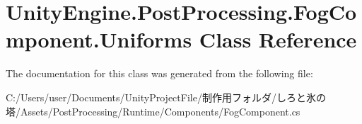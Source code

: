 \hypertarget{class_unity_engine_1_1_post_processing_1_1_fog_component_1_1_uniforms}{}\section{Unity\+Engine.\+Post\+Processing.\+Fog\+Component.\+Uniforms Class Reference}
\label{class_unity_engine_1_1_post_processing_1_1_fog_component_1_1_uniforms}


The documentation for this class was generated from the following file\+:\begin{DoxyCompactItemize}
\item 
C\+:/\+Users/user/\+Documents/\+Unity\+Project\+File/制作用フォルダ/しろと氷の塔/\+Assets/\+Post\+Processing/\+Runtime/\+Components/Fog\+Component.\+cs\end{DoxyCompactItemize}
